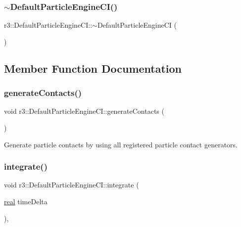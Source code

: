 \subsubsection{\texorpdfstring{$\sim$\+Default\+Particle\+Engine\+C\+I()}{~DefaultParticleEngineCI()}}
{\footnotesize\ttfamily r3\+::\+Default\+Particle\+Engine\+C\+I\+::$\sim$\+Default\+Particle\+Engine\+CI (\begin{DoxyParamCaption}{ }\end{DoxyParamCaption})\hspace{0.3cm}{\ttfamily [default]}}



\subsection{Member Function Documentation}
\mbox{\label{classr3_1_1_default_particle_engine_c_i_a61aea4f32cc73960915d3c68396bd47e}} 
\subsubsection{\texorpdfstring{generate\+Contacts()}{generateContacts()}}
{\footnotesize\ttfamily void r3\+::\+Default\+Particle\+Engine\+C\+I\+::generate\+Contacts (\begin{DoxyParamCaption}{ }\end{DoxyParamCaption})\hspace{0.3cm}{\ttfamily [protected]}}



Generate particle contacts by using all registered particle contact generators. 

\mbox{\label{classr3_1_1_default_particle_engine_c_i_a4603707afe6c841a83294a46ea4a1c62}} 
\subsubsection{\texorpdfstring{integrate()}{integrate()}}
{\footnotesize\ttfamily void r3\+::\+Default\+Particle\+Engine\+C\+I\+::integrate (\begin{DoxyParamCaption}\item[{\mbox{\hyperlink{namespacer3_ab2016b3e3f743fb735afce242f0dc1eb}{real}}}]{time\+Delta }\end{DoxyParamCaption})\hspace{0.3cm}{\ttfamily [override]}, {\ttfamily [virtual]}}



